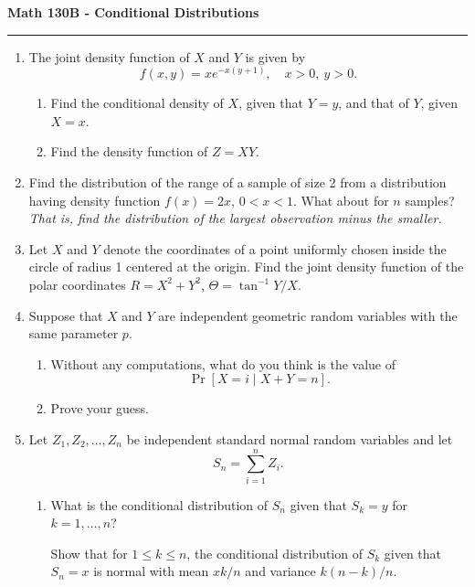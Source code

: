 \documentclass[11pt,letterpaper]{article}
\begin{document}
\begin{center}
{\bf \Large Math 130B - Conditional Distributions}
\vspace{0.2cm}
\hrule
\end{center}

\begin{enumerate}

	\item The joint density function of $X$ and $Y$ is given by
	\[
		f(x,y) = xe^{-x(y+1)},\quad x>0,\ y>0.
	\]
	\begin{enumerate}
		\item Find the conditional density of $X$, given that $Y = y$, and that of $Y$, given $X = x$.
		\vfill

		\item Find the density function of $Z = XY$.
	\end{enumerate}
	\vfill

	\item Find the distribution of the range of a sample of size 2 from a distribution having density function $f(x) = 2x$, $0< x< 1$. What about for $n$ samples? \textit{That is, find the distribution of the largest observation minus the smaller.}

	\vfill

	\item Let $X$ and $Y$ denote the coordinates of a point uniformly chosen inside the circle of radius 1 centered at the origin. Find the joint density function of the polar coordinates $R = X^2 + Y^2$, $\Theta= \tan^{-1}Y/X$.

	\vfill

	\item Suppose that $X$ and $Y$ are independent geometric random variables with the same parameter $p$.
	\begin{enumerate}
		\item Without any computations, what do you think is the value of
		\[
			\Pr[X = i\mid X+Y=n].
		\]

		\vfill

		\item Prove your guess.
	\end{enumerate}	

	\vfill

	\item Let $Z_1, Z_2, \ldots, Z_n$ be independent standard normal random variables and let
	\[
		S_n = \sum_{i=1}^n Z_i.
	\]
	\begin{enumerate}
		\item What is the conditional distribution of $S_n$ given that $S_k = y$ for $k = 1, \ldots, n$?

		\vfill

		Show that for $1\leq k\leq n$, the conditional distribution of $S_k$ given that $S_n = x$ is normal with mean $xk/n$ and variance $k(n-k)/n$.
	\end{enumerate}
	\vfill\null
\end{enumerate}
\end{document}
